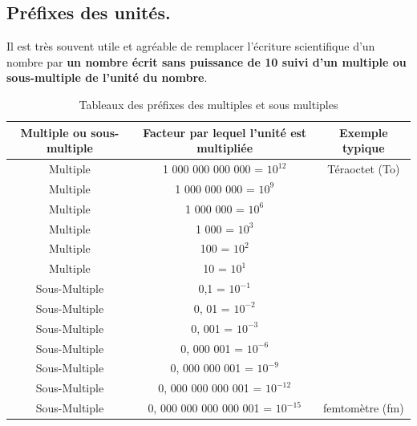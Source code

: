 

\subsection{Préfixes des unités.}
Il est très souvent utile et agréable de remplacer l’écriture scientifique d’un nombre par \textbf{un nombre écrit sans puissance de 10 suivi d'un multiple ou sous-multiple de l'unité du nombre}.
\begin{table}[!h]
    \centering
    \begin{tabularx}{\linewidth}{|c|c|c|}
    \hline
    Multiple ou sous-multiple & Facteur par lequel l'unité est multipliée & Exemple typique \\ 
    \hline 
    Multiple & 1 000 000 000 000 = $10^{12}$ & Téraoctet (To) \\
    \hline
    Multiple & 1 000 000 000 = $10^{9}$ & \\
    \hline
    Multiple & 1 000 000 = $10^{6}$ & \\
    \hline
    Multiple & 1 000 = $10^{3}$ & \\
    \hline
    Multiple & 100 = $10^{2}$ & \\
    \hline
    Multiple & 10 = $10^{1}$ &  \\
    \hline
    Sous-Multiple & 0,1 = $10^{-1}$ &  \\
    \hline
    Sous-Multiple & 0, 01 = $10^{-2}$ &  \\
    \hline
    Sous-Multiple & 0, 001 = $10^{-3}$ &  \\
    
    \hline
    Sous-Multiple & 0, 000 001 = $10^{-6}$ & \\
    \hline
    Sous-Multiple & 0, 000 000 001 = $10^{-9}$ &  \\
    \hline
    Sous-Multiple & 0, 000 000 000 001 = $10^{-12}$ & \\
    \hline
    Sous-Multiple & 0, 000 000 000 000 001 = $10^{-15}$ & femtomètre (fm)\\
    \hline
    \end{tabularx}
    
    \caption{Tableaux des préfixes des multiples et sous multiples}
    \label{tab:chap1_multiples}
\end{table}

